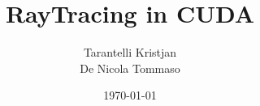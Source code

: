 \documentclass[12pt,a4paper,oneside]{article}
\title{
RayTracing in CUDA
}	                                    %
\author{
Tarantelli Kristjan \\
De Nicola Tommaso
}				                %
\date{\today}									    %
\theoremstyle{definition}
\begin{document}

\newpage
\tableofcontents{}
\newpage

\clearpage

\clearpage

\clearpage

\clearpage

{\RaggedRight
}
\nocite{*}  %
\end{document}
